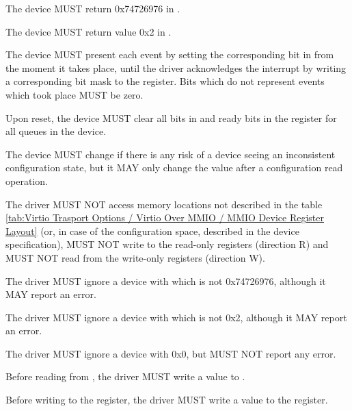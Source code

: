 
The device MUST return 0x74726976 in .

The device MUST return value 0x2 in .

The device MUST present each event by setting the corresponding bit in  from the
moment it takes place, until the driver acknowledges the interrupt
by writing a corresponding bit mask to the  register.  Bits which
do not represent events which took place MUST be zero.

Upon reset, the device MUST clear all bits in  and ready bits in the
 register for all queues in the device.

The device MUST change  if there is any risk of a
device seeing an inconsistent configuration state, but it MAY only change the value
after a configuration read operation.

The driver MUST NOT access memory locations not described in the
table \ref{tab:Virtio Trasport Options / Virtio Over MMIO / MMIO Device Register Layout}
(or, in case of the configuration space, described in the device specification),
MUST NOT write to the read-only registers (direction R) and
MUST NOT read from the write-only registers (direction W).

The driver MUST ignore a device with  which is not 0x74726976,
although it MAY report an error.

The driver MUST ignore a device with  which is not 0x2,
although it MAY report an error.

The driver MUST ignore a device with  0x0,
but MUST NOT report any error.

Before reading from , the driver MUST write a value to .

Before writing to the  register, the driver MUST write a value to the  register.

